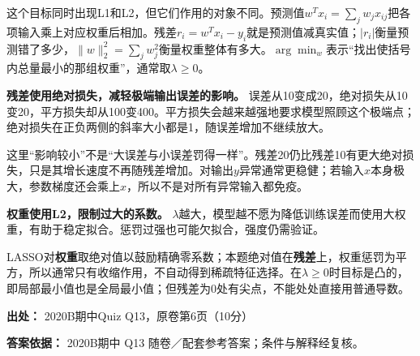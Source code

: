 这个目标同时出现L1和L2，但它们作用的对象不同。预测值\(w^Tx_i=\sum_jw_jx_{ij}\)把各项输入乘上对应权重后相加。残差\(r_i=w^Tx_i-y_i\)就是预测值减真实值；\(|r_i|\)衡量预测错了多少，\(\|w\|_2^2=\sum_jw_j^2\)衡量权重整体有多大。\(\arg\min_w\)表示“找出使括号内总量最小的那组权重”，通常取\(\lambda\ge0\)。


\textbf{残差使用绝对损失，减轻极端输出误差的影响。} 误差从10变成20，绝对损失从10变20，平方损失却从100变400。平方损失会越来越强地要求模型照顾这个极端点；绝对损失在正负两侧的斜率大小都是1，随误差增加不继续放大。


这里“影响较小”不是“大误差与小误差罚得一样”。残差20仍比残差10有更大绝对损失，只是其增长速度不再随残差增加。对输出\(y\)异常通常更稳健；若输入\(x\)本身极大，参数梯度还会乘上\(x\)，所以不是对所有异常输入都免疫。


\textbf{权重使用L2，限制过大的系数。} \(\lambda\)越大，模型越不愿为降低训练误差而使用大权重，有助于稳定拟合。惩罚过强也可能欠拟合，强度仍需验证。


LASSO对\textbf{权重}取绝对值以鼓励精确零系数；本题绝对值在\textbf{残差}上，权重惩罚为平方，所以通常只有收缩作用，不自动得到稀疏特征选择。在\(\lambda\ge0\)时目标是凸的，即局部最小值也是全局最小值；但残差为0处有尖点，不能处处直接用普通导数。


\textbf{出处：} 2020B期中Quiz Q13，原卷第6页（10分）


\textbf{答案依据：} 2020B期中 Q13 随卷／配套参考答案；条件与解释经复核。
